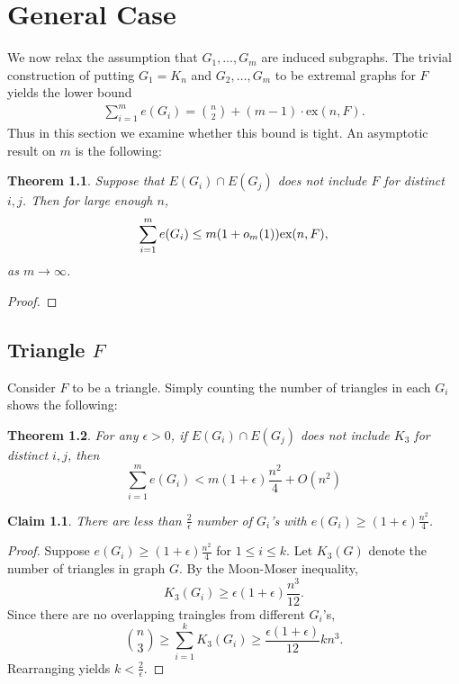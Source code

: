\documentclass[12pt]{report}
\newtheorem{theorem}{Theorem}[chapter]
\newtheorem{claim}{Claim}[theorem]
\begin{document}
\chapter{General Case}

We now relax the assumption that $G_1, \dots, G_m$ are induced subgraphs. The trivial construction
of putting $G_1 = K_n$ and $G_2, \ldots, G_m$ to be extremal graphs for $F$ yields the lower bound
\begin{gather}
	\sum_{i = 1}^m e(G_i) = \binom{n}{2} + (m - 1) \cdot \text{ex}(n, F).
\end{gather}
Thus in this section we examine whether this bound is tight. An asymptotic result on $m$ is the
following:

\begin{theorem}
	Suppose that $E(G_i) \cap E(G_j)$ does not include $F$ for distinct $i, j$. Then for large enough
	$n$,
	\[
		\sum_{i = 1}^m e(G_i) \leq m(1 + o_m(1))\textnormal{ex}(n, F),
	\]
	as $m \to \infty$.
\end{theorem}

\begin{proof}
	
\end{proof}


\section{Triangle $F$}

Consider $F$ to be a triangle. Simply counting the number of triangles in each $G_i$ shows the
following:

\begin{theorem}
	For any $\epsilon > 0$, if $E(G_i) \cap E(G_j)$ does not include $K_3$ for distinct $i, j$, then
	\[
		\sum_{i = 1}^m  e(G_i) < m(1 + \epsilon)\frac{n^2}{4} + O(n^2)
	\]
\end{theorem}

\begin{claim}
	There are less than $\frac{2}{\epsilon}$ number of $G_i$'s with $e(G_i) \geq (1 +
	\epsilon)\frac{n^2}{4}$.
\end{claim}

\begin{proof}
	Suppose $e(G_i) \geq (1 + \epsilon)\frac{n^2}{4}$ for $1\leq i \leq k$. Let $K_3(G)$ denote the
	number of triangles in graph $G$. By the Moon-Moser inequality,
	\[
		K_3(G_i) \geq \epsilon(1 + \epsilon)\frac{n^3}{12}.
	\]
	Since there are no overlapping traingles from different $G_i$'s, 
	\[
		\binom{n}{3} \geq \sum_{i = 1}^k K_3(G_i) \geq \frac{\epsilon(1 + \epsilon)}{12}kn^3.
	\]
	Rearranging yields $k < \frac{2}{\epsilon}$.
\end{proof}
\end{document}
